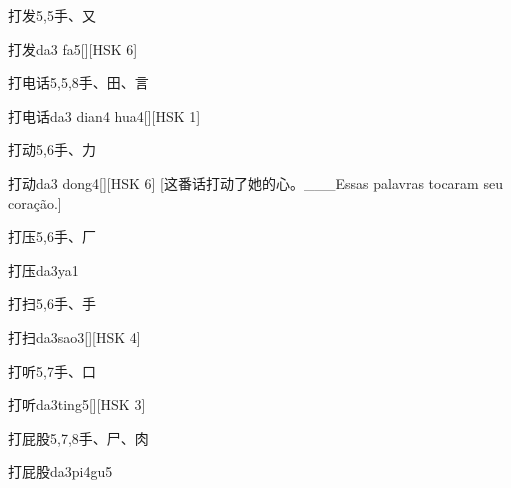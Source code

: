 \begin{entry}{打发}{5,5}{⼿、⼜}
  \begin{phonetics}{打发}{da3 fa5}[][HSK 6]
  \end{phonetics}
\end{entry}

\begin{entry}{打电话}{5,5,8}{⼿、⽥、⾔}
  \begin{phonetics}{打电话}{da3 dian4 hua4}[][HSK 1]
  \end{phonetics}
\end{entry}

\begin{entry}{打动}{5,6}{⼿、⼒}
  \begin{phonetics}{打动}{da3 dong4}[][HSK 6]
    [这番话打动了她的心。___Essas palavras tocaram seu coração.]
  \end{phonetics}
\end{entry}

\begin{entry}{打压}{5,6}{⼿、⼚}
  \begin{phonetics}{打压}{da3ya1}
  \end{phonetics}
\end{entry}

\begin{entry}{打扫}{5,6}{⼿、⼿}
  \begin{phonetics}{打扫}{da3sao3}[][HSK 4]
  \end{phonetics}
\end{entry}

\begin{entry}{打听}{5,7}{⼿、⼝}
  \begin{phonetics}{打听}{da3ting5}[][HSK 3]
  \end{phonetics}
\end{entry}

\begin{entry}{打屁股}{5,7,8}{⼿、⼫、⾁}
  \begin{phonetics}{打屁股}{da3pi4gu5}
  \end{phonetics}
\end{entry}


